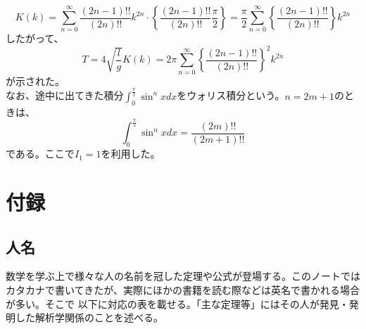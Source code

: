 \documentclass[a4j,dvipdfmx]{jsarticle}
\begin{document}
                        \begin{equation*}
                            K(k)=\sum_{n=0}^{\infty}\frac{(2n-1)!!}{(2n)!!}k^{2n}\cdot \left\{\frac{(2n-1)!!}{(2n)!!}\frac{\pi}{2}\right\}=\frac{\pi}{2}\sum_{n=0}^{\infty}\left\{\frac{(2n-1)!!}{(2n)!!}\right\}k^{2n}
                        \end{equation*}
                        したがって、
                        \begin{equation*}
                            T=4\sqrt{\frac{l}{g}}K(k)=2\pi \sum_{n=0}^{\infty}\left\{\frac{(2n-1)!!}{(2n)!!}\right\}^2k^{2n}
                        \end{equation*}
                        が示された。\\

                        なお、途中に出てきた積分$\int_{0}^{\frac{\pi}{2}}\sin^{n}xdx$をウォリス積分という。$n=2m+1$のときは、
                        \begin{equation*}
                            \int_{0}^{\frac{\pi}{2}}\sin^n x dx=\frac{(2m)!!}{(2m+1)!!}
                        \end{equation*}
                        である。ここで$I_1=1$を利用した。
                                            
        \clearpage
            
        \color{black}
        \section{付録}
            \subsection{人名}
                数学を学ぶ上で様々な人の名前を冠した定理や公式が登場する。このノートではカタカナで書いてきたが、実際にほかの書籍を読む際などは英名で書かれる場合が多い。そこで
                以下に対応の表を載せる。「主な定理等」にはその人が発見・発明した解析学関係のことを述べる。
                
\end{document}
